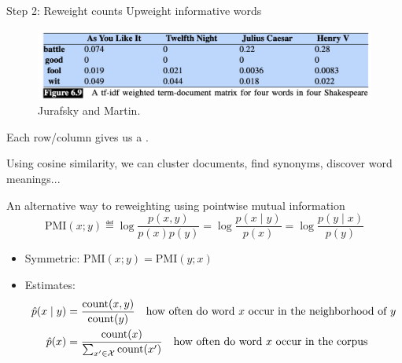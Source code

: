 \documentclass[usenames,dvipsnames,notes,11pt,aspectratio=169]{beamer}
\newcommand{\pdfnote}[1]{}
\begin{document}
\begin{frame}
    {Step 2: Reweight counts}
    Upweight informative words
    \vspace{-1em}
    \begin{figure}
            \includegraphics[width=\textwidth]{figures/term-doc-tfidf}
                    \caption{Jurafsky and Martin.}
    \end{figure}

    Each row/column gives us a .
    \pdfnote{What can you do with it?}
   
    \pause
    Using cosine similarity, we can cluster documents, find synonyms, discover word meanings...
\end{frame}

\begin{frame}
    {An alternative way to reweighting using pointwise mutual information}
    $$
    \text{PMI}(x;y) \eqdef \log \frac{p(x,y)}{p(x)p(y)}
    = \log\frac{p(x\mid y)}{p(x)}
    = \log\frac{p(y\mid x)}{p(y)}
    $$
    \pause
    \vspace{-1em}
    \begin{itemize}
        \itemsep1em
        \item Symmetric: $\text{PMI}(x;y)=\text{PMI}(y;x)$
        \item Estimates:
            \begin{align*}
                \hat{p}(x\mid y) &= \frac{\text{count}(x,y)}{\text{count}(y)} \quad \text{how often do word $x$ occur in the neighborhood of $y$}\\
                \hat{p}(x) &= \frac{\text{count}(x)}{\sum_{x'\in\mathcal{X}}\text{count}(x')}
                \quad \text{how often do word $x$ occur in the corpus}
            \end{align*}
    \end{itemize}
\end{frame}
\end{document}
